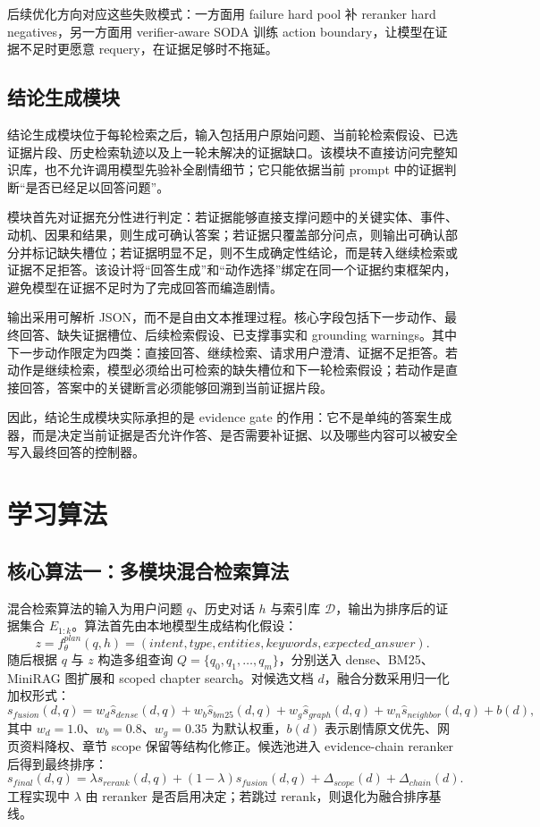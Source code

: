 \documentclass[UTF8,a4paper,12pt]{ctexart}
\begin{document}
后续优化方向对应这些失败模式：一方面用 failure hard pool 补 reranker hard negatives，另一方面用 verifier-aware SODA 训练 action boundary，让模型在证据不足时更愿意 requery，在证据足够时不拖延。

\subsection{结论生成模块}

结论生成模块位于每轮检索之后，输入包括用户原始问题、当前轮检索假设、已选证据片段、历史检索轨迹以及上一轮未解决的证据缺口。该模块不直接访问完整知识库，也不允许调用模型先验补全剧情细节；它只能依据当前 prompt 中的证据判断“是否已经足以回答问题”。

模块首先对证据充分性进行判定：若证据能够直接支撑问题中的关键实体、事件、动机、因果和结果，则生成可确认答案；若证据只覆盖部分问点，则输出可确认部分并标记缺失槽位；若证据明显不足，则不生成确定性结论，而是转入继续检索或证据不足拒答。该设计将“回答生成”和“动作选择”绑定在同一个证据约束框架内，避免模型在证据不足时为了完成回答而编造剧情。

输出采用可解析 JSON，而不是自由文本推理过程。核心字段包括下一步动作、最终回答、缺失证据槽位、后续检索假设、已支撑事实和 grounding warnings。其中下一步动作限定为四类：直接回答、继续检索、请求用户澄清、证据不足拒答。若动作是继续检索，模型必须给出可检索的缺失槽位和下一轮检索假设；若动作是直接回答，答案中的关键断言必须能够回溯到当前证据片段。

因此，结论生成模块实际承担的是 evidence gate 的作用：它不是单纯的答案生成器，而是决定当前证据是否允许作答、是否需要补证据、以及哪些内容可以被安全写入最终回答的控制器。

\section{学习算法}

\subsection{核心算法一：多模块混合检索算法}

混合检索算法的输入为用户问题 $q$、历史对话 $h$ 与索引库 $\mathcal{D}$，输出为排序后的证据集合 $E_{1:k}$。算法首先由本地模型生成结构化假设：
\[
z = f_{\theta}^{plan}(q,h) = (intent, type, entities, keywords, expected\_answer).
\]
随后根据 $q$ 与 $z$ 构造多组查询 $Q=\{q_0,q_1,\ldots,q_m\}$，分别送入 dense、BM25、MiniRAG 图扩展和 scoped chapter search。对候选文档 $d$，融合分数采用归一化加权形式：
\[
s_{fusion}(d,q)=w_d\hat{s}_{dense}(d,q)+w_b\hat{s}_{bm25}(d,q)+w_g\hat{s}_{graph}(d,q)+w_n\hat{s}_{neighbor}(d,q)+b(d),
\]
其中 $w_d=1.0$、$w_b=0.8$、$w_g=0.35$ 为默认权重，$b(d)$ 表示剧情原文优先、网页资料降权、章节 scope 保留等结构化修正。候选池进入 evidence-chain reranker 后得到最终排序：
\[
s_{final}(d,q)=\lambda s_{rerank}(d,q)+(1-\lambda)s_{fusion}(d,q)+\Delta_{scope}(d)+\Delta_{chain}(d).
\]
工程实现中 $\lambda$ 由 reranker 是否启用决定；若跳过 rerank，则退化为融合排序基线。
\end{document}
